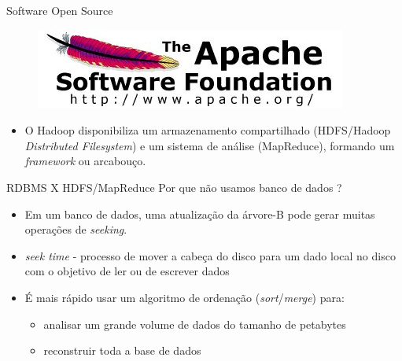 \begin{frame}{Software Open Source}
   \begin{figure}[hb]
     \centering
     \includegraphics[scale=0.2]{asf-logo.jpg}
     \label{fig16:afs}
   \end{figure}

     \begin{itemize}
        \item<1-> O Hadoop disponibiliza um armazenamento compartilhado (HDFS/Hadoop \emph{Distributed Filesystem}) e um sistema de análise (MapReduce), formando um \emph{framework} ou arcabouço.
     \end{itemize}
  \end{frame}

  \begin{frame}{RDBMS X HDFS/MapReduce}
    Por que não usamos banco de dados ?
     \begin{itemize}
        \item<1->  Em um banco de dados, uma atualização da árvore-B pode gerar muitas operações de \emph{seeking}.
        \item<2->  \emph{seek time} - processo de mover a cabeça do disco para um dado local no disco com o objetivo de ler ou de escrever dados
        \item<3->  É mais rápido usar um algoritmo de ordenação (\emph{sort}/\emph{merge}) para:
          \begin{itemize}
             \item<4-> analisar um grande volume de dados do tamanho de petabytes
             \item<5-> reconstruir toda a base de dados
          \end{itemize}
      \end{itemize}
  \end{frame}

